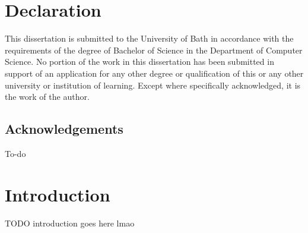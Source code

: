 \documentclass[11pt,a4paper]{article}
\begin{document}
    \section*{Declaration}
    This dissertation is submitted to the University of Bath in accordance with the requirements of the degree of Bachelor of Science in the Department of Computer Science. No portion of the work in this dissertation has been submitted in support of an application for any other degree or qualification of this or any other university or institution of learning. Except where specifically acknowledged, it is the work of the author.

    \newpage

    \tableofcontents
    \listoffigures
    \listoftables

    \newpage

    \begin{center}
    \section*{Acknowledgements}
    To-do



        


        


    \end{center}

    \newpage


    \section{Introduction}
    TODO introduction goes here lmao
\end{document}
